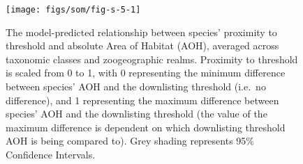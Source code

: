 \documentclass[
  12pt,
  a4paper,
]{article}
\begin{document}
\pagebreak



\begin{figure}

{\centering \texttt{[image: figs/som/fig-s-5-1]} 

}

\caption{The model-predicted relationship between species' proximity to threshold and absolute Area of Habitat (AOH), averaged across taxonomic classes and zoogeographic realms. Proximity to threshold is scaled from 0 to 1, with 0 representing the minimum difference between species' AOH and the downlisting threshold (i.e.~no difference), and 1 representing the maximum difference between species' AOH and the downlisting threshold (the value of the maximum difference is dependent on which downlisting threshold AOH is being compared to). Grey shading represents 95\% Confidence Intervals.}\label{fig:fig-s-5}
\end{figure}
\end{document}
